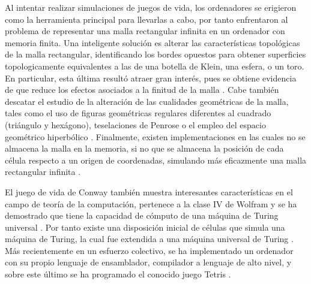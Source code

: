 \documentclass[../proyecto.tex]{book}
\begin{document}
Al intentar realizar simulaciones de juegos de vida, los ordenadores se erigieron como la herramienta principal para llevarlas a cabo, por tanto enfrentaron al problema de representar una malla rectangular infinita en un ordenador con memoria finita. Una inteligente solución es alterar las características topológicas de la malla rectangular, identificando los bordes opuestos para obtener superficies topologicamente equivalentes a las de una botella de Klein, una esfera, o un toro. En particular, esta última resultó atraer gran interés, pues se obtiene evidencia de que reduce los efectos asociados a la finitud de la malla \cite{finitudMalla, finitudMalla2}. Cabe también descatar el estudio de la alteración de las cualidades geométricas de la malla, tales como el uso de figuras geométricas regulares diferentes al cuadrado (triángulo y hexágono)\cite{triangular}, teselaciones de Penrose \cite{penrose} o el empleo del espacio geométrico hiperbólico \cite{hiperbolico}. Finalmente, existen implementaciones en las cuales no se almacena la malla en la memoria, si no que se almacena la posición de cada célula respecto a un origen de coordenadas, simulando más eficazmente una malla  rectangular infinita \cite{boardless}.

El juego de vida de Conway también muestra interesantes características en el campo de teoría de la computación, pertenece a la clase IV de Wolfram \cite{ccuatro, ccuatro2} y se ha demostrado que tiene la capacidad de cómputo de una máquina de Turing universal \cite{turingUniversal}. Por tanto existe una disposición inicial de células que simula una máquina de Turing, la cual fue extendida a una máquina universal de Turing \cite{turing}. Más recientemente en un esfuerzo colectivo, se ha implementado un ordenador con su propio lenguaje de ensamblador, compilador a lenguaje de alto nivel, y sobre este último se ha programado el conocido juego Tetris \cite{tetris, logical}.
\end{document}
